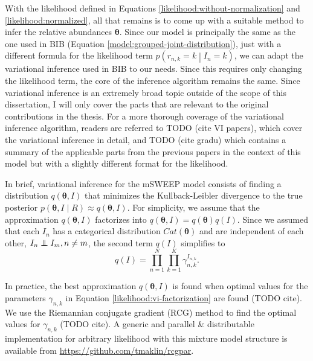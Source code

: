 \documentclass[officiallayout]{tktla}
\newcommand\indept{\protect\mathpalette{\protect\independenT}{\perp}}
\def\independenT#1#2{\mathrel{\rlap{$#1#2$}\mkern2mu{#1#2}}}
\begin{document}
With the likelihood defined in Equations
\ref{likelihood:without-normalization} and
\ref{likelihood:normalized}, all that remains is to come up with a
suitable method to infer the relative abundances
$\boldsymbol\theta$. Since our model is principally the same as the
one used in BIB (Equation \ref{model:grouped-joint-distribution}),
just with a different formula for the likelihood term $p\left(r_{n, k}
= k \middle| I_{n} = k\right)$, we can adapt the variational inference
used in BIB to our needs. Since this requires only changing the
likelihood term, the core of the inference algorithm remains the
same. Since variational inference is an extremely broad topic outside
of the scope of this dissertation, I will only cover the parts that
are relevant to the original contributions in the thesis. For a more
thorough coverage of the variational inference algorithm, readers are
referred to TODO (cite VI papers), which cover the variational
inference in detail, and TODO (cite gradu) which contains a summary of
the applicable parts from the previous papers in the context of this
model but with a slightly different format for the likelihood.

In brief, variational inference for the mSWEEP model consists of
finding a distribution $q\left(\boldsymbol\theta, I\right)$ that
minimizes the Kullback-Leibler divergence to the true posterior
$p\left(\boldsymbol\theta, I \middle| R\right) \approx
q\left(\boldsymbol\theta, I\right)$. For simplicity, we assume that
the approximation $q\left(\boldsymbol\theta, I\right)$ factorizes into
$q\left(\boldsymbol\theta, I\right) =
q\left(\boldsymbol\theta\right)q\left(I\right)$. Since we assumed that
each $I_{n}$ has a categorical distribution
$Cat\left(\boldsymbol\theta\right)$ and are independent of each other,
$I_{n} \indept I_{m}, n \neq m$, the second term $q\left(I\right)$
simplifies to
\begin{equation}
  \label{likelihood:vi-factorization}
  q\left(I\right) = \prod_{n = 1}^N\prod_{k = 1}^K \gamma_{n, k}^{I_{n, k}}.
\end{equation}

In practice, the best approximation $q\left(\boldsymbol\theta,
I\right)$ is found when optimal values for the parameters $\gamma_{n,
  k}$ in Equation \ref{likelihood:vi-factorization} are found (TODO
cite). We use the Riemannian conjugate gradient (RCG) method to find
the optimal values for $\gamma_{n, k}$ (TODO cite). A generic and
parallel \& distributable implementation for arbitrary likelihood with
this mixture model structure is available from
\url{https://github.com/tmaklin/rcgpar}.
\end{document}
